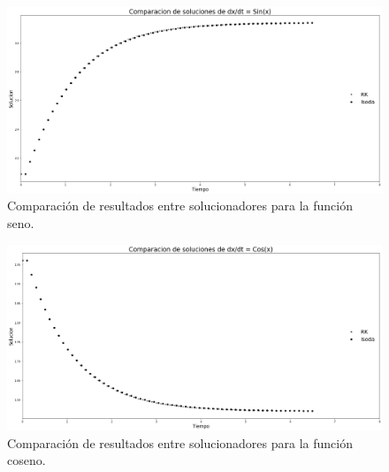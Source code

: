 \documentclass[12pt,letterpaper]{article}
\begin{document}
\begin{figure}
 \centering
 \includegraphics[scale=0.25]{img/lsoda_rk_sin.png}
 \caption{Comparación de resultados entre solucionadores para la función seno.}
 \label{fig: lsoda rk sin}
\end{figure}

\begin{figure}
 \centering
 \includegraphics[scale=0.25]{img/lsoda_rk_cos.png}
 \caption{Comparación de resultados entre solucionadores para la función coseno.}
 \label{fig: lsoda rk cos}
\end{figure}

\printbibliography
\end{document}
